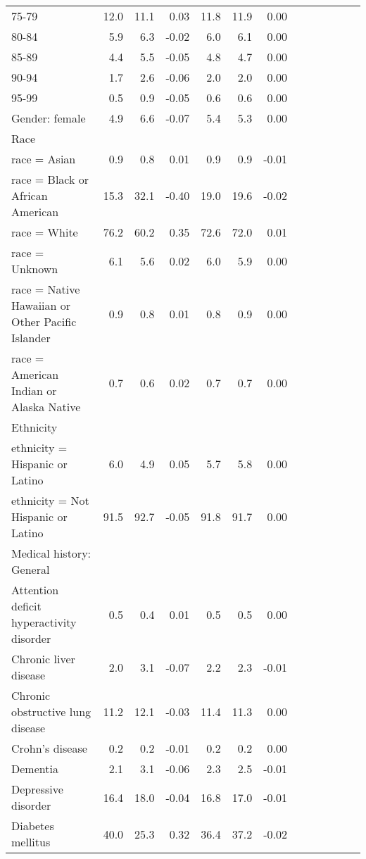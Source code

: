 \documentclass[11pt,]{article}
\begin{document}
\begin{longtable}{lrrrrrrrrrrrr}
      75-79 & 12.0 & 11.1 &  0.03 & 11.8 & 11.9 &  0.00 \\ 
      80-84 &  5.9 &  6.3 & -0.02 &  6.0 &  6.1 &  0.00 \\ 
      85-89 &  4.4 &  5.5 & -0.05 &  4.8 &  4.7 &  0.00 \\ 
      90-94 &  1.7 &  2.6 & -0.06 &  2.0 &  2.0 &  0.00 \\ 
      95-99 &  0.5 &  0.9 & -0.05 &  0.6 &  0.6 &  0.00 \\ 
  Gender: female &  4.9 &  6.6 & -0.07 &  5.4 &  5.3 &  0.00 \\ 
  Race &    &    &     &    &    &     \\ 
      race = Asian &  0.9 &  0.8 &  0.01 &  0.9 &  0.9 & -0.01 \\ 
      race = Black or African American & 15.3 & 32.1 & -0.40 & 19.0 & 19.6 & -0.02 \\ 
      race = White & 76.2 & 60.2 &  0.35 & 72.6 & 72.0 &  0.01 \\ 
      race = Unknown &  6.1 &  5.6 &  0.02 &  6.0 &  5.9 &  0.00 \\ 
      race = Native Hawaiian or Other Pacific Islander &  0.9 &  0.8 &  0.01 &  0.8 &  0.9 &  0.00 \\ 
      race = American Indian or Alaska Native &  0.7 &  0.6 &  0.02 &  0.7 &  0.7 &  0.00 \\ 
  Ethnicity &    &    &     &    &    &     \\ 
      ethnicity = Hispanic or Latino &  6.0 &  4.9 &  0.05 &  5.7 &  5.8 &  0.00 \\ 
      ethnicity = Not Hispanic or Latino & 91.5 & 92.7 & -0.05 & 91.8 & 91.7 &  0.00 \\ 
  Medical history: General &    &    &     &    &    &     \\ 
      Attention deficit hyperactivity disorder &  0.5 &  0.4 &  0.01 &  0.5 &  0.5 &  0.00 \\ 
      Chronic liver disease &  2.0 &  3.1 & -0.07 &  2.2 &  2.3 & -0.01 \\ 
      Chronic obstructive lung disease & 11.2 & 12.1 & -0.03 & 11.4 & 11.3 &  0.00 \\ 
      Crohn's disease &  0.2 &  0.2 & -0.01 &  0.2 &  0.2 &  0.00 \\ 
      Dementia &  2.1 &  3.1 & -0.06 &  2.3 &  2.5 & -0.01 \\ 
      Depressive disorder & 16.4 & 18.0 & -0.04 & 16.8 & 17.0 & -0.01 \\ 
      Diabetes mellitus & 40.0 & 25.3 &  0.32 & 36.4 & 37.2 & -0.02 \\ 

\end{longtable}
\end{document}
